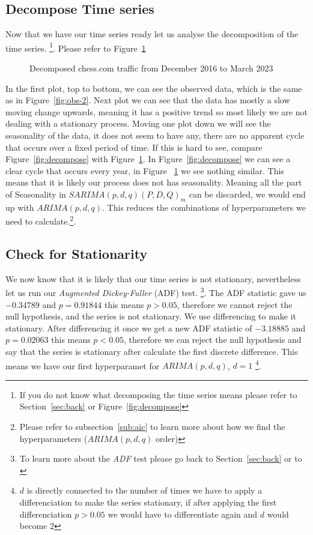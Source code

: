 \documentclass[journal]{IEEEtran}
\begin{document}
\subsection{Decompose Time series}\label{sub:decompose-time-series}

Now that we have our time series ready let us analyse the decomposition of the
time series. \footnote{If you do not know what decomposing the time series
means please refer to Section~\ref{sec:back} or Figure~\ref{fig:decompose}}.
Please refer to Figure~\ref{fig:decom-chess}

\begin{figure}[htbp]
  \centering
  
    \caption{Decomposed chess.com traffic from December 2016 to March 2023}
    \label{fig:decom-chess}
\end{figure}

In the first plot, top to bottom, we can see the observed data, which is the
same as in Figure~\ref{fig:obs-2}. Next plot we can see that the data has
mostly a slow moving change upwards, meaning it has a positive trend so most
likely we are not dealing with a stationary process. Moving one plot down we
will see the seasonality of the data, it does not seem to have any, there are
no apparent cycle that occurs over a fixed period of time.  If this is hard to
see, compare Figure~\ref{fig:decompose} with Figure~\ref{fig:decom-chess}. In
Figure~\ref{fig:decompose} we can see a clear cycle that occurs every year, in
Figure ~\ref{fig:decom-chess} we see nothing similar. This means that it is
likely our process does not has seasonality. Meaning all the part of
Seasonality in $SARIMA(p,d,q)(P,D,Q)_m$ can be discarded, we would end up with
$ARIMA(p,d,q)$. This reduces the combinations of hyperparameters we need to
calculate.\footnote{Please refer to subsection~\ref{sub:aic} to learn more
about how we find the hyperparameters ($ARIMA(p,d,q)$ order)}.

\subsection{Check for Stationarity}

We now know that it is likely that our time series is not stationary,
nevertheless let us run our \emph{Augmented Dickey-Fuller} (ADF) test.
\footnote{To learn more about the \emph{ADF} test please go back to
Section~\ref{sec:back} or to \cite{adf}}. The ADF statistic gave us $-0.34789$
and $p = 0.91844$ this means $p > 0.05$, therefore we cannot reject the null
hypothesis, and the series is not stationary. We use differencing to make it
stationary. After differencing it once we get a new ADF statistic of
$-3.18885$ and $p = 0.02063$ this means $p < 0.05$, therefore we can reject
the null hypothesis and say that the series is stationary after calculate the
first discrete difference. This means we have our first hyperparamet for
$ARIMA(p,d,q)$, $d = 1$ \footnote{$d$ is directly connected to the number of
times we have to apply a differenciation to make the series stationary, if
after applying the first differenciation $p > 0.05$ we would have to
differentiate again and $d$ would become 2}.
\end{document}
